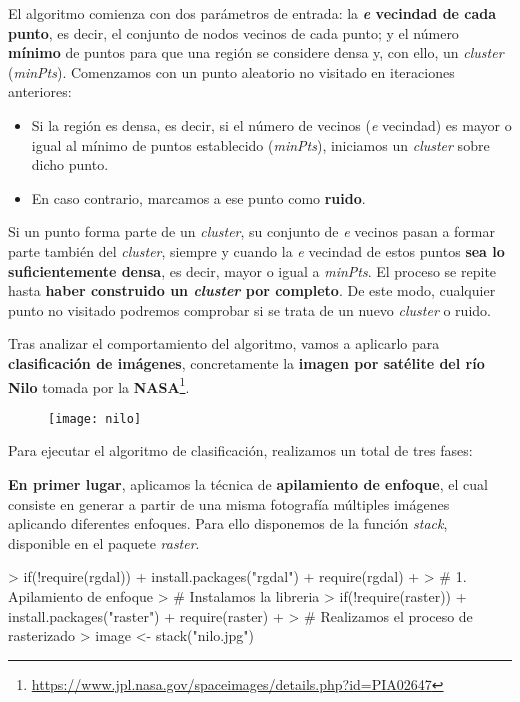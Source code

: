 \documentclass [a4paper] {article}
\begin{document}
El algoritmo comienza con dos parámetros de entrada: la \textbf{\textit{e} vecindad de cada punto}, es decir, el conjunto de nodos vecinos de cada punto; y el número \textbf{mínimo} de puntos para que una región se considere densa y, con ello, un \textit{cluster} (\textit{minPts}). 
Comenzamos con un punto aleatorio no visitado en iteraciones anteriores:
\begin{itemize}
  \item Si la región es densa, es decir, si el número de vecinos (\textit{e} vecindad) es mayor o igual al mínimo de puntos establecido (\textit{minPts}), iniciamos un \textit{cluster} sobre dicho punto. 
  \item En caso contrario, marcamos a ese punto como \textbf{ruido}.
\end{itemize}

Si un punto forma parte de un \textit{cluster}, su conjunto de \textit{e} vecinos pasan a formar parte también del \textit{cluster}, siempre y cuando la \textit{e} vecindad de estos puntos \textbf{sea lo suficientemente densa}, es decir, mayor o igual a \textit{minPts}. El proceso se repite hasta \textbf{haber construido un \textit{cluster} por completo}. De este modo, cualquier punto no visitado podremos comprobar si se trata de un nuevo \textit{cluster} o ruido.

Tras analizar el comportamiento del algoritmo, vamos a aplicarlo para \textbf{clasificación de imágenes}, concretamente la \textbf{imagen por satélite del río Nilo} tomada por la \textbf{NASA}\footnote{\url{https://www.jpl.nasa.gov/spaceimages/details.php?id=PIA02647}}.

\begin{figure}[h!]
\centering
\texttt{[image: nilo]}
\end{figure}

Para ejecutar el algoritmo de clasificación, realizamos un total de tres fases:

\textbf{En primer lugar}, aplicamos la técnica de \textbf{apilamiento de enfoque}, el cual consiste en generar a partir de una misma fotografía múltiples imágenes aplicando diferentes enfoques. Para ello disponemos de la función \textit{stack}, disponible en el paquete \textit{raster}.
\begin{Schunk}
\begin{Sinput}
> if(!require(rgdal)){
+   install.packages("rgdal")
+   require(rgdal)
+ }
> # 1. Apilamiento de enfoque
> # Instalamos la libreria
> if(!require(raster)){
+   install.packages("raster")
+   require(raster)
+ }
> # Realizamos el proceso de rasterizado
> image <- stack("nilo.jpg")
\end{Sinput}
\end{Schunk}
\end{document}
